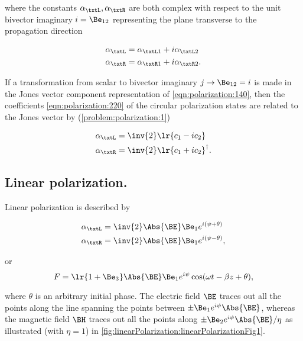 where the constants \( \alpha_\txtL, \alpha_\txtR \) are both complex with respect to the unit bivector imaginary \( i = \Be_{12} \) representing the plane transverse to the propagation direction

\begin{dmath}\label{eqn:polarization:220}
\begin{aligned}
\alpha_\txtL &= \alpha_{\txtL 1} + i \alpha_{\txtL 2} \\
\alpha_\txtR &= \alpha_{\txtR 1} + i \alpha_{\txtR 2}.
\end{aligned}
\end{dmath}

If a transformation from scalar to bivector imaginary \( j \rightarrow \Be_{12} = i \) is made in the Jones vector component representation of \cref{eqn:polarization:140},
then
the coefficients \cref{eqn:polarization:220} of the circular polarization states are related to the Jones vector by (\cref{problem:polarization:1})

\begin{dmath}\label{eqn:polarization:260}
\begin{aligned}
\alpha_\txtL &= \inv{2}\lr{ c_1 - i c_2 } \\
\alpha_\txtR &= \inv{2}\lr{ c_1 + i c_2 }^\dagger.
\end{aligned}
\end{dmath}

\subsection{Linear polarization.}

Linear polarization is described by

\begin{dmath}\label{eqn:polarization:280}
\begin{aligned}
\alpha_\txtL &= \inv{2}\Abs{\BE} \Be_1 e^{i(\psi + \theta)} \\
\alpha_\txtR &= \inv{2}\Abs{\BE} \Be_1 e^{i(\psi - \theta)},
\end{aligned}
\end{dmath}

or
\begin{dmath}\label{eqn:polarization:300}
F = \lr{ 1 + \Be_3 } \Abs{\BE} \Be_1 e^{i\psi} \cos( \omega t - \beta z + \theta ),
\end{dmath}

where \( \theta \) is an arbitrary initial phase.  The electric field \( \BE \) traces out all the points along the line spanning the points between \( \pm \Be_1 e^{i\psi} \Abs{\BE} \), whereas the magnetic field \( \BH \) traces
out all the points along \( \pm \Be_2 e^{i\psi} \Abs{\BE}/\eta \) as illustrated (with \( \eta = 1 \)) in
\cref{fig:linearPolarization:linearPolarizationFig1}.

